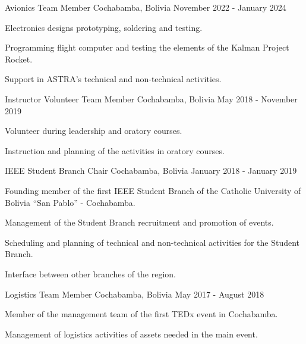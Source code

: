 

\begin{cventries}
  {Avionics Team Member}
  {Cochabamba, Bolivia}
  {November 2022 - January 2024}
  {%
    \begin{cvitems}
      \item Electronics designs prototyping, soldering and testing.
      \item Programming flight computer and testing the elements of
      the Kalman Project Rocket.
      \item Support in ASTRA's technical and non-technical activities.
    \end{cvitems}
  }%

  {Instructor Volunteer Team Member}
  {Cochabamba, Bolivia}
  {May 2018 - November 2019}
  {%
    \begin{cvitems}
      \item Volunteer during leadership and oratory courses.
      \item Instruction and planning of the activities in oratory
      courses.
    \end{cvitems}
  }

  {IEEE Student Branch Chair}
  {Cochabamba, Bolivia} 
  {January 2018 - January 2019} 
  {%
    \begin{cvitems}
      \item Founding member of the first IEEE Student Branch of the
      Catholic University of Bolivia ``San Pablo'' - Cochabamba.
      \item Management of the Student Branch recruitment and promotion
      of events.
      \item Scheduling and planning of technical and non-technical
      activities for the Student Branch.
      \item Interface between other branches of the region.
    \end{cvitems}
  }

  {Logistics Team Member}
  {Cochabamba, Bolivia}
  {May 2017 - August 2018}
  {%
    \begin{cvitems}
      \item Member of the management team of the first TEDx event in
      Cochabamba.
      \item Management of logistics activities of assets needed in the
      main event.
    \end{cvitems}
  }

\end{cventries}
